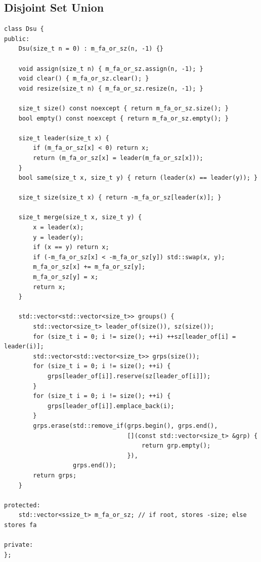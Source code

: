 \documentclass[UTF8]{article}
\begin{document}
\subsection{Disjoint Set Union}
\begin{verbatim}
class Dsu {
public:
	Dsu(size_t n = 0) : m_fa_or_sz(n, -1) {}

	void assign(size_t n) { m_fa_or_sz.assign(n, -1); }
	void clear() { m_fa_or_sz.clear(); }
	void resize(size_t n) { m_fa_or_sz.resize(n, -1); }

	size_t size() const noexcept { return m_fa_or_sz.size(); }
	bool empty() const noexcept { return m_fa_or_sz.empty(); }

	size_t leader(size_t x) {
		if (m_fa_or_sz[x] < 0) return x;
		return (m_fa_or_sz[x] = leader(m_fa_or_sz[x]));
	}
	bool same(size_t x, size_t y) { return (leader(x) == leader(y)); }

	size_t size(size_t x) { return -m_fa_or_sz[leader(x)]; }

	size_t merge(size_t x, size_t y) {
		x = leader(x);
		y = leader(y);
		if (x == y) return x;
		if (-m_fa_or_sz[x] < -m_fa_or_sz[y]) std::swap(x, y);
		m_fa_or_sz[x] += m_fa_or_sz[y];
		m_fa_or_sz[y] = x;
		return x;
	}

	std::vector<std::vector<size_t>> groups() {
		std::vector<size_t> leader_of(size()), sz(size());
		for (size_t i = 0; i != size(); ++i) ++sz[leader_of[i] = leader(i)];
		std::vector<std::vector<size_t>> grps(size());
		for (size_t i = 0; i != size(); ++i) {
			grps[leader_of[i]].reserve(sz[leader_of[i]]);
		}
		for (size_t i = 0; i != size(); ++i) {
			grps[leader_of[i]].emplace_back(i);
		}
		grps.erase(std::remove_if(grps.begin(), grps.end(),
								  [](const std::vector<size_t> &grp) {
									  return grp.empty();
								  }),
				   grps.end());
		return grps;
	}

protected:
	std::vector<ssize_t> m_fa_or_sz; // if root, stores -size; else stores fa

private:
};
\end{verbatim}
\end{document}
